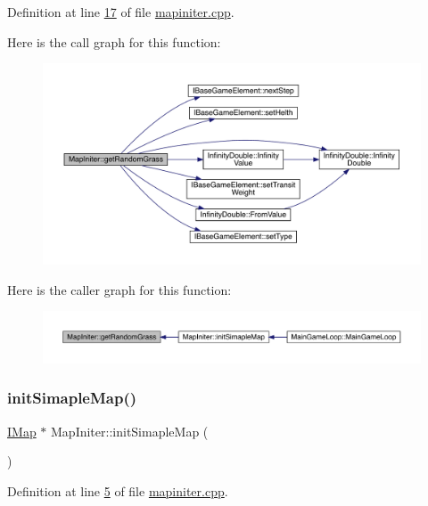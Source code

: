 Definition at line \hyperlink{a00095_source_l00017}{17} of file \hyperlink{a00095_source}{mapiniter.\+cpp}.

Here is the call graph for this function\+:
\nopagebreak
\begin{figure}[H]
\begin{center}
\leavevmode
\includegraphics[width=350pt]{df/d24/a00217_a8961b80aa1df5f628bd4e28e66a51d0b_cgraph}
\end{center}
\end{figure}
Here is the caller graph for this function\+:
\nopagebreak
\begin{figure}[H]
\begin{center}
\leavevmode
\includegraphics[width=350pt]{df/d24/a00217_a8961b80aa1df5f628bd4e28e66a51d0b_icgraph}
\end{center}
\end{figure}
\mbox{\label{a00217_ae6dfbed9cc8569db78442c0bfe57e252}} 
\subsubsection{\texorpdfstring{init\+Simaple\+Map()}{initSimapleMap()}}
{\footnotesize\ttfamily \hyperlink{a00165}{I\+Map} $\ast$ Map\+Initer\+::init\+Simaple\+Map (\begin{DoxyParamCaption}{ }\end{DoxyParamCaption})}



Definition at line \hyperlink{a00095_source_l00005}{5} of file \hyperlink{a00095_source}{mapiniter.\+cpp}.

